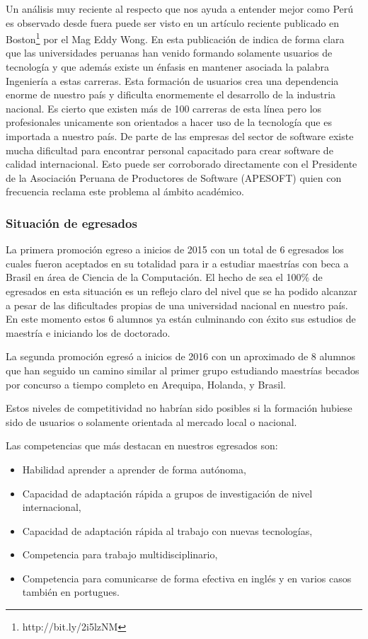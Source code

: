 Un análisis muy reciente al respecto que nos ayuda a entender mejor como Perú es observado desde fuera puede ser visto en un 
artículo reciente publicado en Boston\footnote{http://bit.ly/2i5lzNM} por el Mag Eddy Wong.
En esta publicación de indica de forma clara que las universidades peruanas han venido formando solamente usuarios de tecnología y 
que además existe un énfasis en mantener asociada la palabra Ingeniería a estas carreras.
Esta formación de usuarios crea una dependencia enorme de nuestro país y dificulta enormemente el desarrollo de la industria nacional.
Es cierto que existen más de 100 carreras de esta línea pero los profesionales unicamente son orientados a hacer uso de la tecnología que es importada a nuestro país.
De parte de las empresas del sector de software existe mucha dificultad para encontrar personal capacitado para crear software de calidad internacional.
Esto puede ser corroborado directamente con el Presidente de la Asociación Peruana de Productores de Software (APESOFT) 
quien con frecuencia reclama este problema al ámbito académico.

\subsubsection{Situación de egresados}
La primera promoción egreso a inicios de 2015 con un total de 6 egresados los cuales fueron aceptados en su totalidad 
para ir a estudiar maestrías con beca a Brasil en área de Ciencia de la Computación.
El hecho de sea el 100\% de egresados en esta situación es un reflejo claro del nivel que se ha podido alcanzar a 
pesar de las dificultades propias de una universidad nacional en nuestro país.
En este momento estos 6 alumnos ya están culminando con éxito sus estudios de maestría e iniciando los de doctorado.

La segunda promoción egresó a inicios de 2016 con un aproximado de 8 alumnos que han seguido un camino similar al primer 
grupo estudiando maestrías becados por concurso a tiempo completo en Arequipa, Holanda, y Brasil.

Estos niveles de competitividad no habrían sido posibles si la formación hubiese sido de usuarios o 
solamente orientada al mercado local o nacional. 

Las competencias que más destacan en nuestros egresados son:
\begin{itemize}
\item Habilidad aprender a aprender de forma autónoma,
\item Capacidad de adaptación rápida a grupos de investigación de nivel internacional,
\item Capacidad de adaptación rápida al trabajo con nuevas tecnologías,
\item Competencia para trabajo multidisciplinario,
\item Competencia para comunicarse de forma efectiva en inglés y en varios casos también en portugues.
\end{itemize}

